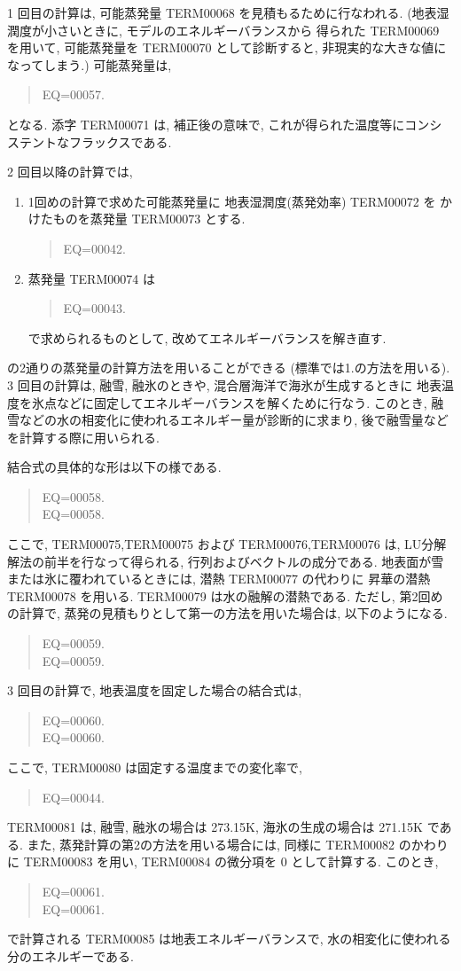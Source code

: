 1 回目の計算は, 可能蒸発量 TERM00068 を見積もるために行なわれる.
(地表湿潤度が小さいときに, モデルのエネルギーバランスから
得られた TERM00069 を用いて, 可能蒸発量を
TERM00070
として診断すると, 非現実的な大きな値になってしまう.)
可能蒸発量は,
\begin{quote}
EQ=00057.
\end{quote}
となる.
添字 TERM00071 は, 補正後の意味で, 
これが得られた温度等にコンシステントなフラックスである.
    
2 回目以降の計算では, 
\begin{enumerate}
\item 1回めの計算で求めた可能蒸発量に
      地表湿潤度(蒸発効率) TERM00072 を
      かけたものを蒸発量 TERM00073 とする.
      \begin{quote}
EQ=00042.
\end{quote}

\item 蒸発量 TERM00074 は
      \begin{quote}
EQ=00043.
\end{quote}
      で求められるものとして, 
      改めてエネルギーバランスを解き直す.
\end{enumerate}
の2通りの蒸発量の計算方法を用いることができる
(標準では1.の方法を用いる).
3 回目の計算は, 融雪, 融氷のときや, 混合層海洋で海氷が生成するときに
地表温度を氷点などに固定してエネルギーバランスを解くために行なう. 
このとき, 融雪などの水の相変化に使われるエネルギー量が診断的に求まり, 
後で融雪量などを計算する際に用いられる. 

結合式の具体的な形は以下の様である. 
%
\begin{quote}
\nonumber
EQ=00058.\\
\label{combin-eq}
EQ=00058.
\end{quote}
%
ここで, TERM00075,TERM00075 および TERM00076,TERM00076 は, 
LU分解解法の前半を行なって得られる, 行列およびベクトルの成分である. 
地表面が雪または氷に覆われているときには, 潜熱 TERM00077 の代わりに
昇華の潜熱 TERM00078 を用いる. TERM00079 は水の融解の潜熱である. 
%
ただし, 第2回めの計算で, 
蒸発の見積もりとして第一の方法を用いた場合は, 以下のようになる.
\begin{quote}
\nonumber
EQ=00059.\\
EQ=00059.
\end{quote}

3 回目の計算で, 地表温度を固定した場合の結合式は, 
\begin{quote}
\nonumber
EQ=00060.\\
\label{combin-eq3}
EQ=00060.
\end{quote}
ここで, TERM00080 は固定する温度までの変化率で, 
\begin{quote}
EQ=00044.
\end{quote}
TERM00081 は, 融雪, 融氷の場合は 273.15K, 
海氷の生成の場合は 271.15K である. 
また, 蒸発計算の第2の方法を用いる場合には,
同様に TERM00082 のかわりに TERM00083 を用い,
TERM00084 の微分項を 0 として計算する.
このとき, 
\begin{quote}
\nonumber
EQ=00061.\\
EQ=00061.
\end{quote}
で計算される TERM00085 は地表エネルギーバランスで, 
水の相変化に使われる分のエネルギーである. 

